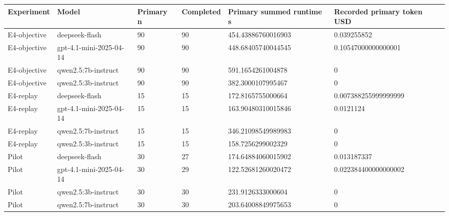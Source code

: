 \begin{tabular}{llllll}
\hline
Experiment & Model & Primary n & Completed & Primary summed runtime s & Recorded primary token USD \\
\hline
E4-objective & deepseek-flash & 90 & 90 & 454.43886760016903 & 0.039255852 \\
E4-objective & gpt-4.1-mini-2025-04-14 & 90 & 90 & 448.68405740044545 & 0.10547000000000001 \\
E4-objective & qwen2.5:7b-instruct & 90 & 90 & 591.1654261004878 & 0 \\
E4-objective & qwen2.5:3b-instruct & 90 & 90 & 382.3000107995467 & 0 \\
E4-replay & deepseek-flash & 15 & 15 & 172.8165755000664 & 0.007388255999999999 \\
E4-replay & gpt-4.1-mini-2025-04-14 & 15 & 15 & 163.90480310015846 & 0.0121124 \\
E4-replay & qwen2.5:7b-instruct & 15 & 15 & 346.21098549989983 & 0 \\
E4-replay & qwen2.5:3b-instruct & 15 & 15 & 158.7256299002329 & 0 \\
Pilot & deepseek-flash & 30 & 27 & 174.64884060015902 & 0.013187337 \\
Pilot & gpt-4.1-mini-2025-04-14 & 30 & 29 & 122.52681260020472 & 0.022384400000000002 \\
Pilot & qwen2.5:3b-instruct & 30 & 30 & 231.9126333000604 & 0 \\
Pilot & qwen2.5:7b-instruct & 30 & 30 & 203.64008849975653 & 0 \\
\hline
\end{tabular}
